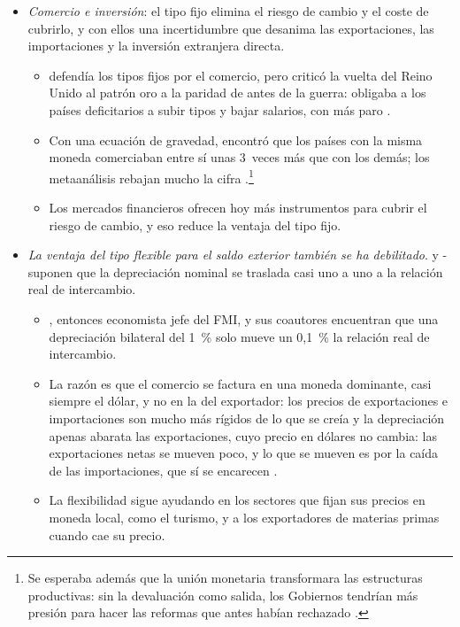 \documentclass[11pt]{article}
\begin{document}
\begin{itemize}
\item \emph{Comercio e inversión}: el tipo fijo elimina el riesgo de cambio y el coste de cubrirlo, y con ellos una incertidumbre que desanima las exportaciones, las importaciones y la inversión extranjera directa.
  \begin{itemize}
  \item {} defendía los tipos fijos por el comercio, pero criticó la vuelta del Reino Unido al patrón oro a la paridad de antes de la guerra: obligaba a los países deficitarios a subir tipos y bajar salarios, con más paro\nocite{Keynes1925Economic} .
  \item Con una ecuación de gravedad, \textcite{Rose2000One} encontró que los países con la misma moneda comerciaban entre sí unas 3~veces más que con los demás; los metaanálisis rebajan mucho la cifra\nocite{RoseStanley2005Meta,GlickRose2016Currency}  .\footnote{Se esperaba además que la unión monetaria transformara las estructuras productivas: sin la devaluación como salida, los Gobiernos tendrían más presión para hacer las reformas que antes habían rechazado .}
  \item Los mercados financieros ofrecen hoy más instrumentos para cubrir el riesgo de cambio, y eso reduce la ventaja del tipo fijo.
  \end{itemize}
\item \emph{La ventaja del tipo flexible para el saldo exterior también se ha debilitado}.  y - suponen que la depreciación nominal se traslada casi uno a uno a la relación real de intercambio.
  \begin{itemize}
  \item {}, entonces economista jefe del FMI, y sus coautores encuentran que una depreciación bilateral del 1~\% solo mueve un 0,1~\% la relación real de intercambio\nocite{BozGopinathPlagborgMoller2017}.
  \item La razón es que el comercio se factura en una moneda dominante, casi siempre el dólar, y no en la del exportador: los precios de exportaciones e importaciones son mucho más rígidos de lo que se creía y la depreciación apenas abarata las exportaciones, cuyo precio en dólares no cambia: las exportaciones netas se mueven poco, y lo que se mueven es por la caída de las importaciones, que sí se encarecen\nocite{Gopinath2020DCP} .
  \item La flexibilidad sigue ayudando en los sectores que fijan sus precios en moneda local, como el turismo, y a los exportadores de materias primas cuando cae su precio.

\end{itemize}
\end{itemize}
\end{document}
